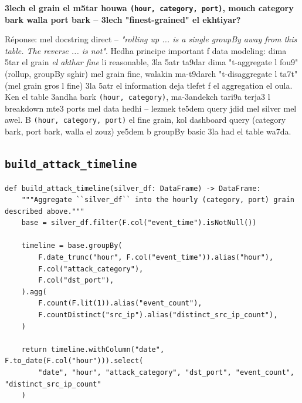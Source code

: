 \documentclass[11pt,a4paper]{report}
\DeclareRobustCommand{\code}[1]{\texttt{#1}}
\begin{document}
\begin{soual}
\textbf{3lech el grain el m5tar houwa \code{(hour, category, port)}, mouch
category bark walla port bark -- 3lech "finest-grained" el ekhtiyar?}

Réponse: mel docstring direct -- \emph{"rolling up ... is a single groupBy
away from this table. The reverse ... is not"}. Hedha principe important
f data modeling: dima 5tar el grain \emph{el akthar fine} li reasonable,
3la 5atr ta9dar dima "t-aggregate l fou9" (rollup, groupBy sghir) mel
grain fine, walakin ma-t9darch "t-disaggregate l ta7t" (mel grain gros
l fine) 3la 5atr el information deja tlefet f el aggregation el oula.
Ken el table 3andha bark \code{(hour, category)}, ma-3andekch tari9a
terja3 l breakdown mte3 ports mel data hedhi -- lezmek te5dem query
jdid mel silver mel awel. B \code{(hour, category, port)} el fine grain,
kol dashboard query (category bark, port bark, walla el zouz) ye5dem
b groupBy basic 3la had el table wa7da.
\end{soual}

\subsection{\code{build\_attack\_timeline}}

\begin{lstlisting}[style=pystyle]
def build_attack_timeline(silver_df: DataFrame) -> DataFrame:
    """Aggregate ``silver_df`` into the hourly (category, port) grain described above."""
    base = silver_df.filter(F.col("event_time").isNotNull())

    timeline = base.groupBy(
        F.date_trunc("hour", F.col("event_time")).alias("hour"),
        F.col("attack_category"),
        F.col("dst_port"),
    ).agg(
        F.count(F.lit(1)).alias("event_count"),
        F.countDistinct("src_ip").alias("distinct_src_ip_count"),
    )

    return timeline.withColumn("date", F.to_date(F.col("hour"))).select(
        "date", "hour", "attack_category", "dst_port", "event_count", "distinct_src_ip_count"
    )
\end{lstlisting}
\end{document}
